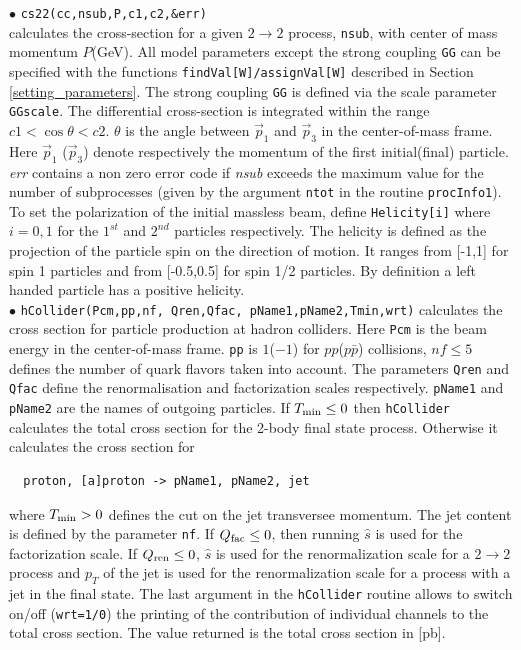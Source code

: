 \documentclass[12pt,a4paper]{article}
\begin{document}
\noindent
$\bullet$ \verb|cs22(cc,nsub,P,c1,c2,&err)|\\
calculates  the cross-section for a given $2\rightarrow 2$
process, \verb|nsub|, with  center of mass momentum $P$(GeV). 
All model parameters  except the strong coupling {\tt GG}
can be specified with the functions {\tt findVal[W]/assignVal[W]}
described in Section \ref{setting_parameters}. The strong coupling {\tt GG}
is defined via the scale parameter {\tt GGscale}.    
The
differential cross-section is integrated
 within the range  $ c1 < \cos\theta <c2 $. $\theta$ is
the angle between $\vec{p}_1$ and $\vec{p}_3$  in the
center-of-mass frame. Here $\vec{p}_1$ ($\vec{p}_3$) denote
respectively the momentum of the first initial(final) particle.
{\it err} contains a non zero error code if {\it nsub} exceeds the
maximum value  for the number of subprocesses (given by the
argument \verb|ntot| in the routine {\tt procInfo1}). To set the polarization 
of the initial massless beam, define   \verb|Helicity[i]|  where $i=0,1$ 
for the $1^{st}$ and $2^{nd}$ particles respectively.
The   helicity is defined as the projection of the particle spin
on the direction of motion. It ranges from  [-1,1] for spin 1 particles and 
from [-0.5,0.5]  for spin 1/2 particles.
By definition a left handed particle has a positive
helicity. \\[2mm]
%
\noindent$\bullet$ \verb|hCollider(Pcm,pp,nf, Qren,Qfac, pName1,pName2,Tmin,wrt)| 
calculates the cross
section for particle production at hadron colliders. Here \verb|Pcm| 
is the beam energy  in the center-of-mass frame. \verb|pp| is
$1$($-1$) for $pp$($p\bar{p}$) collisions, $ nf \le 5$  defines the
number of quark flavors taken into account.
The parameters  {\tt Qren} and  {\tt Qfac} define the renormalisation and factorization
 scales respectively. {\tt pName1} and {\tt pName2} are the names of outgoing
particles. If $T_{\rm min} \le 0 $ then {\tt hCollider} calculates the total  
cross section for the 2-body final state  process. Otherwise it calculates the cross
section for
\begin{verbatim}
  proton, [a]proton -> pName1, pName2, jet
\end{verbatim} 
where $ T_{\rm min}>0 $  defines the cut on the  jet transversee momentum. 
The jet content is defined by the  parameter \verb|nf|. 
If $Q_{\rm fac} \le 0 $, then  running  $\hat{s}$ is used for the
factorization  scale. If  $Q_{\rm ren} \le 0 $,  
$\hat{s}$ is used for the renormalization scale for a $2\to2$ process and $p_{T}$ of the jet is used for the renormalization scale for a process with a jet in the final state.
The last argument in the  {\tt hCollider} routine allows to switch
on/off ({\tt wrt=1/0}) the printing  of the contribution of individual channels to the total
cross section.   The value returned  is the total  cross section in [pb]. 
\end{document}
